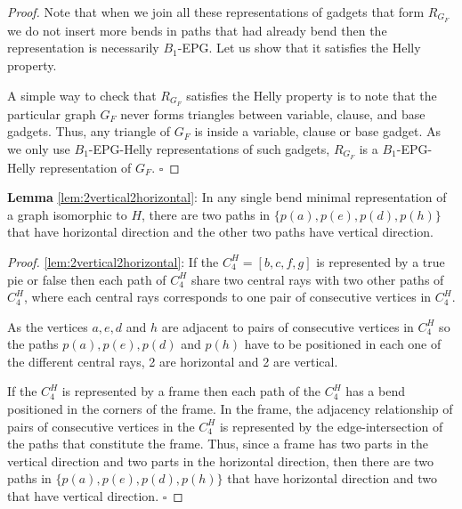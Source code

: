 \documentclass[runningheads]{llncs}
\begin{document}
\begin{proof}






Note that when we join all these representations of gadgets that form $ R_{G_F} $ we do not insert more bends in paths that had already bend then the representation is necessarily  $ B_1$-EPG. Let us show that it satisfies the Helly property. 

A simple way to check that $ R_{G_F} $ satisfies the Helly property  is to note that the particular graph $G_F$ never forms triangles between variable, clause, and base gadgets. Thus, any triangle of $G_F$ is inside a variable, clause or base gadget. As we only use $B_1$-EPG-Helly representations of such gadgets, $ R_{G_F} $ is a $B_1$-EPG-Helly representation of $G_F$.
$\square$ \end{proof}

\begin{lemma*}\textbf{Lemma} \ref{lem:2vertical2horizontal}:
In any single bend minimal representation of a graph isomorphic to $H$, there are two paths in $\{p(a), p(e), p(d), p(h) \}$ that have horizontal direction and the other two paths have vertical direction.
\end{lemma*}

\begin{proof}%
\ref{lem:2vertical2horizontal}:
If the $C_4^{H} = [b,c,f,g]$ is  represented by a true pie or false then each path of $C_4^{H}$ share two central rays with two other paths of $C_4^{H}$, where each central rays corresponds to one pair of consecutive vertices in $C_4^{H}$.

As the vertices $a, e, d $ and $ h$ are adjacent to pairs of consecutive vertices in $C_4^{H}$ so the paths $p(a), p(e), p(d)$ and $p(h)$ have to be positioned in each one of the different central rays,  2 are horizontal  and 2 are vertical.

If the $C_4^{H}$ is  represented by a frame then each path of the $C_4^{H}$ has a bend positioned in  the corners of the frame. In the frame, the adjacency relationship of pairs of consecutive vertices in the $C_4^{H}$ is represented by the edge-intersection of the paths that constitute the frame. Thus, since a frame has two parts in the vertical direction and two parts in the horizontal direction, then there are two paths in $\{p(a), p(e), p(d), p(h)\}$ that have horizontal direction and two that have vertical direction.
$\square$ \end{proof}
\end{document}
